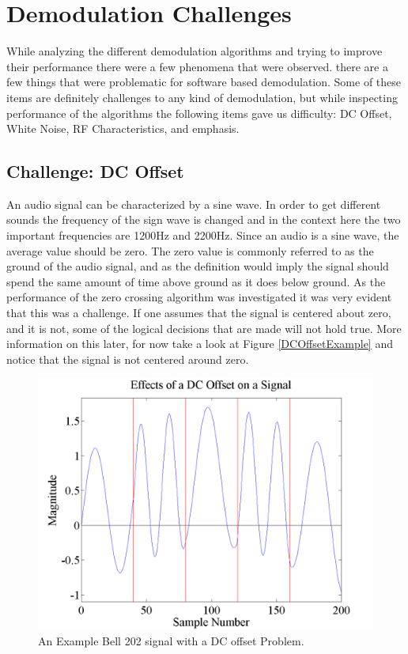 \chapter{Demodulation Challenges}
While analyzing the different demodulation algorithms and trying to improve their performance there were a few phenomena that were observed. there are a few things that were problematic for software based demodulation. Some of these items are definitely challenges to any kind of demodulation, but while inspecting performance of the algorithms the following items gave us difficulty: DC Offset, White Noise, RF Characteristics, and emphasis.

\section{Challenge: DC Offset}
An audio signal can be characterized by a sine wave. In order to get different sounds the frequency of the sign wave is changed and in the context here the two important frequencies are 1200Hz and 2200Hz. Since an audio is a sine wave, the average value should be zero. The zero value is commonly referred to as the ground of the audio signal, and as the definition would imply the signal should spend the same amount of time above ground as it does below ground. As the performance of the zero crossing algorithm was investigated it was very evident that this was a challenge. If one assumes that the signal is centered about zero, and it is not, some of the logical decisions that are made will not hold true. More information on this later, for now take a look at Figure \ref{DCOffsetExample} and notice that the signal is not centered around zero.
\begin{figure}
  \centering
	\includegraphics[width=0.75\linewidth]{images/EffectsofaDCOffsetonaSignal.png} 
	\caption{An Example Bell 202 signal with a DC offset Problem.}
   \label{DCOfsetExample}
\end{figure}

